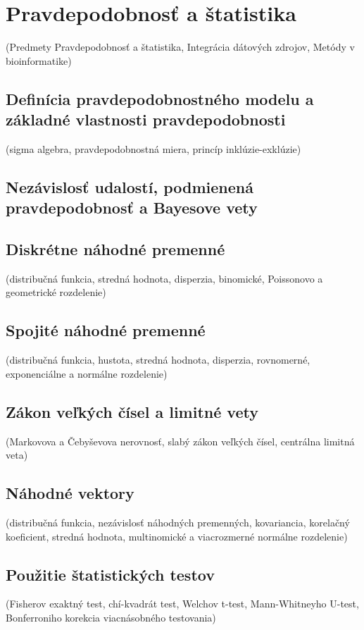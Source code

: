 \chapter[Pravdepodobnosť a štatistika]{Pravdepodobnosť a štatistika}
\label{pravdepodobnost_a_statistika} %

(Predmety Pravdepodobnosť a štatistika, Integrácia dátových zdrojov, Metódy v bioinformatike)

\section{Definícia pravdepodobnostného modelu a základné vlastnosti pravdepodobnosti}

	(sigma algebra, pravdepodobnostná miera, princíp inklúzie-exklúzie)

\section{Nezávislosť udalostí, podmienená pravdepodobnosť a Bayesove vety}

\section{Diskrétne náhodné premenné}

	(distribučná funkcia, stredná hodnota, disperzia, binomické, Poissonovo a geometrické rozdelenie)

\section{Spojité náhodné premenné}
	(distribučná funkcia, hustota, stredná hodnota, disperzia, rovnomerné,
exponenciálne a normálne rozdelenie)

\section{Zákon veľkých čísel a limitné vety}

	(Markovova a Čebyševova nerovnosť, slabý zákon veľkých čísel, centrálna limitná veta)

\section{Náhodné vektory}

	(distribučná funkcia, nezávislosť náhodných premenných, kovariancia, korelačný koeficient, stredná hodnota, multinomické a viacrozmerné normálne rozdelenie)

\section{Použitie štatistických testov}

	(Fisherov exaktný test, chí-kvadrát test, Welchov t-test, Mann-Whitneyho U-test, Bonferroniho korekcia viacnásobného testovania)
